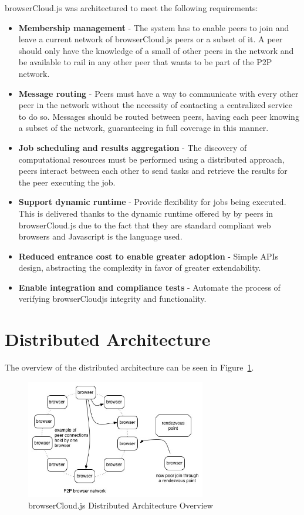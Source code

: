 browserCloud.js was architectured to meet the following requirements:

\begin{itemize}
    \item \textbf{Membership management} - The system has to enable peers to join and leave a current network of browserCloud.js peers or a subset of it. A peer should only have the knowledge of a small of other peers in the network and be available to rail in any other peer that wants to be part of the P2P network.
    \item \textbf{Message routing} - Peers must have a way to communicate with every other peer in the network without the necessity of contacting a centralized service to do so. Messages should be routed between peers, having each peer knowing a subset of the network, guaranteeing in full coverage in this manner.
    \item \textbf{Job scheduling and results aggregation} - The discovery of computational resources must be performed using a distributed approach, peers interact between each other to send tasks and retrieve the results for the peer executing the job.
    \item \textbf{Support dynamic runtime} - Provide flexibility for jobs being executed. This is delivered thanks to the dynamic runtime offered by by peers in browserCloud.js due to the fact that they are standard compliant web browsers and Javascript is the language used.
    \item \textbf{Reduced entrance cost to enable greater adoption} - Simple APIs design, abstracting the complexity in favor of greater extendability.
    \item \textbf{Enable integration and compliance tests} - Automate the process of verifying browserCloudjs integrity and functionality.
\end{itemize}

\section{Distributed Architecture}

The overview of the distributed architecture can be seen in Figure~\ref{fig:n-a-o}.

\begin{figure}[h!]
  \centering
  \includegraphics[width=0.7\textwidth]{figs/network-architecture-overview}
  \caption{browserCloud.js Distributed Architecture Overview}
  \label{fig:n-a-o}
\end{figure}

